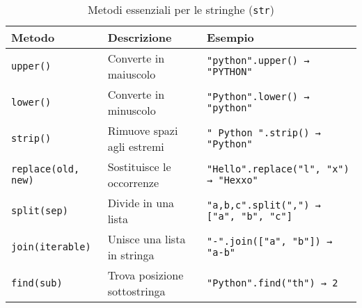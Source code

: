 \begin{table}[H]
\centering
\caption{Metodi essenziali per le stringhe (\texttt{str})}
\begin{tabularx}{\textwidth}{|l|X|l|}
\hline
\textbf{Metodo} & \textbf{Descrizione} & \textbf{Esempio} \\
\hline
\texttt{upper()} & Converte in maiuscolo & \texttt{"python".upper() → "PYTHON"} \\
\hline
\texttt{lower()} & Converte in minuscolo & \texttt{"Python".lower() → "python"} \\
\hline
\texttt{strip()} & Rimuove spazi agli estremi & \texttt{"  Python  ".strip() → "Python"} \\
\hline
\texttt{replace(old, new)} & Sostituisce le occorrenze & \texttt{"Hello".replace("l", "x") → "Hexxo"} \\
\hline
\texttt{split(sep)} & Divide in una lista & \texttt{"a,b,c".split(",") → ["a", "b", "c"]} \\
\hline
\texttt{join(iterable)} & Unisce una lista in stringa & \texttt{"-".join(["a", "b"]) → "a-b"} \\
\hline
\texttt{find(sub)} & Trova posizione sottostringa & \texttt{"Python".find("th") → 2} \\
\hline
\end{tabularx}
\end{table}



